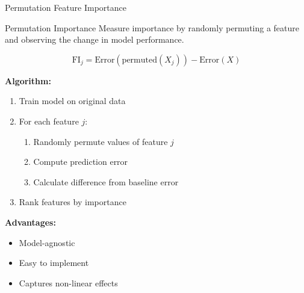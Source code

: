 \documentclass[aspectratio=169]{beamer}
\begin{document}
\begin{frame}{Permutation Feature Importance}
  \begin{definitionbox}{Permutation Importance}
    Measure importance by randomly permuting a feature and observing the change in model performance.

    \begin{equation}
      \text{FI}_j = \text{Error}(\text{permuted}(X_j)) - \text{Error}(X)
    \end{equation}
  \end{definitionbox}

  \vspace{0.5em}

  \textbf{Algorithm:}
  \begin{enumerate}
    \item Train model on original data
    \item For each feature $j$:
    \begin{enumerate}
      \item Randomly permute values of feature $j$
      \item Compute prediction error
      \item Calculate difference from baseline error
    \end{enumerate}
    \item Rank features by importance
  \end{enumerate}

  \vspace{0.5em}

  \textbf{Advantages:}
  \begin{itemize}
    \item Model-agnostic
    \item Easy to implement
    \item Captures non-linear effects
  \end{itemize}
\end{frame}
\end{document}
